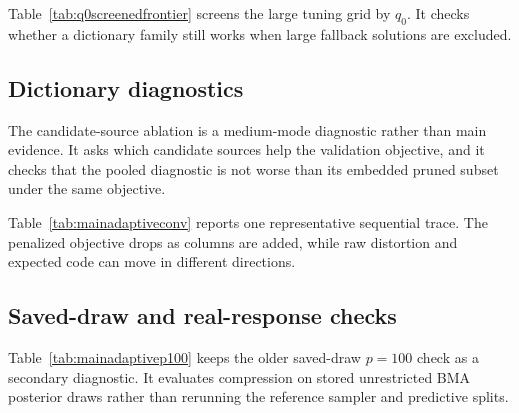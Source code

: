 \documentclass[twoside,11pt]{article}
\begin{document}
Table~\ref{tab:q0screenedfrontier} screens the large tuning grid by \(q_0\). It checks whether a dictionary family still works when large fallback solutions are excluded.

\begin{table}[!htbp]
\centering
\small

\caption{\(q_0\)-screened large \(p=100\) frontier. This is a screen over the fitted tuning grid, not a separate constrained optimization run.}
\label{tab:q0screenedfrontier}
\end{table}

\subsection{Dictionary diagnostics}
\label{subsec:ablationdiagnostics}

The candidate-source ablation is a medium-mode diagnostic rather than main evidence. It asks which candidate sources help the validation objective, and it checks that the pooled diagnostic is not worse than its embedded pruned subset under the same objective.

\begin{table}[!htbp]
\centering
\scriptsize
\resizebox{\textwidth}{!}{}
\caption{Candidate-source ablation.}
\label{tab:adaptiveablationdetail}
\end{table}

Table~\ref{tab:mainadaptiveconv} reports one representative sequential trace. The penalized objective drops as columns are added, while raw distortion and expected code can move in different directions.

\begin{table}[!htbp]
\centering
\scriptsize

\caption{Sequential column-generation trace.}
\label{tab:mainadaptiveconv}
\end{table}

\subsection{Saved-draw and real-response checks}
\label{subsec:largersaveddraw}

Table~\ref{tab:mainadaptivep100} keeps the older saved-draw \(p=100\) check as a secondary diagnostic. It evaluates compression on stored unrestricted BMA posterior draws rather than rerunning the reference sampler and predictive splits.
\end{document}
